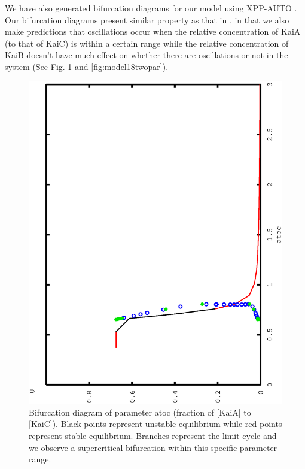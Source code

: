 \documentclass[a4paper,10pt]{article}
\numberwithin{equation}{section}
\begin{document}
We have also generated bifurcation diagrams for our model using XPP-AUTO . Our bifurcation diagrams present similar property as that in \citet{van2007}, in that we  also make predictions that oscillations occur when the relative concentration of KaiA (to that of KaiC) is within a certain range while the relative concentration of KaiB doesn't have much effect on whether there are oscillations or not in the system (See Fig. \ref{fig:model18bifur} and \ref{fig:model18twopar}). 
\begin{figure}[H]
\centering
\includegraphics[scale=0.45]{model18bifur.ps}
\caption{\selectfont Bifurcation diagram of parameter atoc (fraction of [KaiA] to [KaiC]). Black points represent unstable equilibrium while red points represent stable equilibrium. Branches represent the limit cycle and we observe a supercritical bifurcation within this specific parameter range. }\label{fig:model18bifur}
\end{figure}
\end{document}
